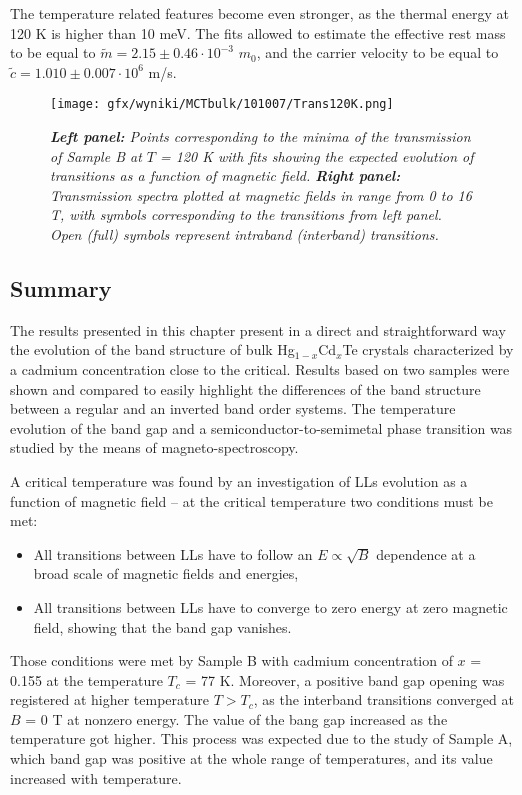 \documentclass[titlepage,a4paper]{book}
\begin{document}
The temperature related features become even stronger, as the thermal energy at 120 K is higher than 10 meV. The fits allowed to estimate the effective rest mass to be equal to $\tilde m = 2.15 \pm 0.46 \cdot 10^{-3}$ $m_0$, and the carrier velocity to be equal to $\tilde{c} = 1.010 \pm 0.007 \cdot 10^6$ m/s.

\begin{figure}[H]
	\centering
	\texttt{[image: gfx/wyniki/MCTbulk/101007/Trans120K.png]}
	\vspace{-10pt}
	\caption{\textit{\textbf{Left panel:} Points corresponding to the minima of the transmission of Sample B at $T$ = 120 K with fits showing the expected evolution of transitions as a function of magnetic field. \textbf{Right panel:} Transmission spectra plotted at magnetic fields in range from 0 to 16 T, with symbols corresponding to the transitions from left panel. Open (full) symbols represent intraband (interband) transitions.}}
	\label{fig:Spectra_101007_120K}
\end{figure}


\subsection{Summary}
The results presented in this chapter present in a direct and straightforward way the evolution of the band structure of bulk Hg$_{1-x}$Cd$_{x}$Te crystals characterized by a cadmium concentration close to the critical. Results based on two samples were shown and compared to easily highlight the differences of the band structure between a regular and an inverted band order systems. The temperature evolution of the band gap and a semiconductor-to-semimetal phase transition was studied by the means of magneto-spectroscopy. 

A critical temperature was found by an investigation of LLs evolution as a function of magnetic field -- at the critical temperature two conditions must be met: 
\begin{itemize}
\item All transitions between LLs have to follow an $E \propto \sqrt{B}$ dependence at a broad scale of magnetic fields and energies,
\item All transitions between LLs have to converge to zero energy at zero magnetic field, showing that the band gap vanishes.
\end{itemize}

Those conditions were met by Sample B with cadmium concentration of $x$ = 0.155 at the temperature $T_c$ = 77 K. Moreover, a positive band gap opening was registered at higher temperature $T > T_c$, as the interband transitions converged at $B$ = 0 T at nonzero energy. The value of the bang gap increased as the temperature got higher. This process was expected due to the study of Sample A, which band gap was positive at the whole range of temperatures, and its value increased with temperature.  
\end{document}
